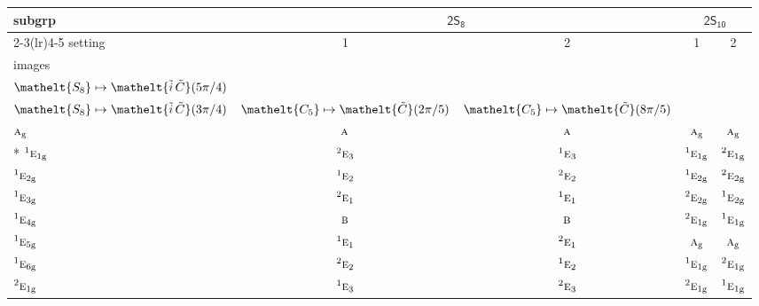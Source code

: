 \documentclass[10pt,a4paper]{article}
\numberwithin{equation}{section}
\newcommand{\eltfont}[1]{{\let\sigma\eltsigma\mathelt{#1}}}
\newcommand{\grp}[1]{\mathsf{#1}}
\newcommand{\irr}[1]{\text{\normalfont\scshape #1}}
\newcommand{\conjpair}[1]{{}^{#1}}
\newcommand{\cls}[1]{\eltfont{#1}}
\newcommand{\elt}[1]{\eltfont{#1}}
\newcommand{\ptag}[1]{\mathrm{#1}}
\newcommand{\lift}[1]{\tilde{#1}}
\begin{document}
{\small\begin{longtable}{@{}lcccc@{}}\toprule
subgrp & \multicolumn{2}{c}{\href{2S8.pdf}{$\grp{2S_{8}}$}} & \multicolumn{2}{c}{\href{2S10.pdf}{$\grp{2S_{10}}$}}\\\cmidrule(lr){2-3}\cmidrule(lr){4-5}
setting & 1 & 2 & 1 & 2\\
images & {\scriptsize\begin{tabular}[t]{@{}c@{}}$\cls{C_{4}} \mapsto \elt{\lift{C}}(\pi/2)$\\$\cls{S_{8}} \mapsto \elt{\lift{i}\,\lift{C}}(5\pi/4)$\end{tabular}} & {\scriptsize\begin{tabular}[t]{@{}c@{}}$\cls{C_{4}} \mapsto \elt{\lift{C}}(3\pi/2)$\\$\cls{S_{8}} \mapsto \elt{\lift{i}\,\lift{C}}(3\pi/4)$\end{tabular}} & {\scriptsize $\cls{C_{5}} \mapsto \elt{\lift{C}}(2\pi/5)$} & {\scriptsize $\cls{C_{5}} \mapsto \elt{\lift{C}}(8\pi/5)$}\\\midrule\endhead
\bottomrule\endfoot\endlastfoot
$\irr{a}_{\ptag{g}}$ & $\irr{a}$ & $\irr{a}$ & $\irr{a}_{\ptag{g}}$ & $\irr{a}_{\ptag{g}}$\\*
$\conjpair{1}\irr{e}_{1\ptag{g}}$ & $\conjpair{2}\irr{e}_{3}$ & $\conjpair{1}\irr{e}_{3}$ & $\conjpair{1}\irr{e}_{1\ptag{g}}$ & $\conjpair{2}\irr{e}_{1\ptag{g}}$\\
$\conjpair{1}\irr{e}_{2\ptag{g}}$ & $\conjpair{1}\irr{e}_{2}$ & $\conjpair{2}\irr{e}_{2}$ & $\conjpair{1}\irr{e}_{2\ptag{g}}$ & $\conjpair{2}\irr{e}_{2\ptag{g}}$\\
$\conjpair{1}\irr{e}_{3\ptag{g}}$ & $\conjpair{2}\irr{e}_{1}$ & $\conjpair{1}\irr{e}_{1}$ & $\conjpair{2}\irr{e}_{2\ptag{g}}$ & $\conjpair{1}\irr{e}_{2\ptag{g}}$\\
$\conjpair{1}\irr{e}_{4\ptag{g}}$ & $\irr{b}$ & $\irr{b}$ & $\conjpair{2}\irr{e}_{1\ptag{g}}$ & $\conjpair{1}\irr{e}_{1\ptag{g}}$\\
$\conjpair{1}\irr{e}_{5\ptag{g}}$ & $\conjpair{1}\irr{e}_{1}$ & $\conjpair{2}\irr{e}_{1}$ & $\irr{a}_{\ptag{g}}$ & $\irr{a}_{\ptag{g}}$\\
$\conjpair{1}\irr{e}_{6\ptag{g}}$ & $\conjpair{2}\irr{e}_{2}$ & $\conjpair{1}\irr{e}_{2}$ & $\conjpair{1}\irr{e}_{1\ptag{g}}$ & $\conjpair{2}\irr{e}_{1\ptag{g}}$\\
$\conjpair{2}\irr{e}_{1\ptag{g}}$ & $\conjpair{1}\irr{e}_{3}$ & $\conjpair{2}\irr{e}_{3}$ & $\conjpair{2}\irr{e}_{1\ptag{g}}$ & $\conjpair{1}\irr{e}_{1\ptag{g}}$\\

\end{longtable}}
\end{document}
